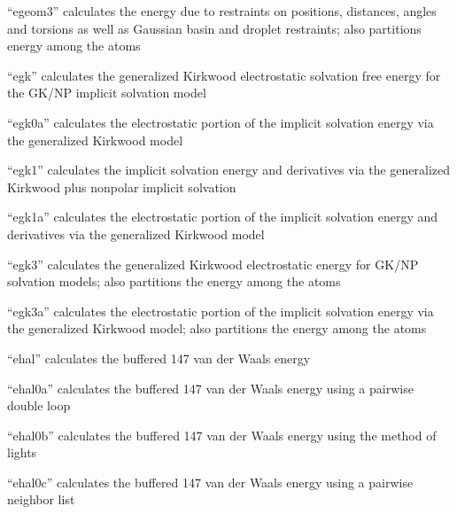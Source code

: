 \documentclass[letterpaper,11pt,english]{sphinxmanual}
\begin{document}

“egeom3” calculates the energy due to restraints on positions,
distances, angles and torsions as well as Gaussian basin and
droplet restraints; also partitions energy among the atoms


“egk” calculates the generalized Kirkwood electrostatic
solvation free energy for the GK/NP implicit solvation model


“egk0a” calculates the electrostatic portion of the implicit
solvation energy via the generalized Kirkwood model


“egk1” calculates the implicit solvation energy and derivatives
via the generalized Kirkwood plus nonpolar implicit solvation


“egk1a” calculates the electrostatic portion of the implicit
solvation energy and derivatives via the generalized Kirkwood
model


“egk3” calculates the generalized Kirkwood electrostatic
energy for GK/NP solvation models; also partitions the
energy among the atoms


“egk3a” calculates the electrostatic portion of the implicit
solvation energy via the generalized Kirkwood model; also
partitions the energy among the atoms


“ehal” calculates the buffered 14\sphinxhyphen{}7 van der Waals energy


“ehal0a” calculates the buffered 14\sphinxhyphen{}7 van der Waals energy
using a pairwise double loop


“ehal0b” calculates the buffered 14\sphinxhyphen{}7 van der Waals energy
using the method of lights


“ehal0c” calculates the buffered 14\sphinxhyphen{}7 van der Waals energy
using a pairwise neighbor list
\end{document}
